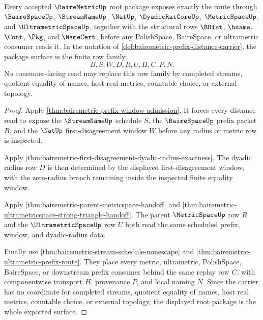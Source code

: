 \begin{theorem}
\label{thm:bairemetric-root-prefix-ultrametric-package}
Every accepted $\BaireMetricUp$ root package exposes exactly the route through $\BaireSpaceUp$, $\StreamNameUp$, $\NatUp$, $\DyadicRatCoreUp$, $\MetricSpaceUp$, and $\UltrametricSpaceUp$, together with the structural rows $\BHist$, $\hsame$, $\Cont$, $\Pkg$, and $\NameCert$, before any PolishSpace, BaireSpace, or ultrametric consumer reads it. In the notation of \autoref{def:bairemetric-prefix-distance-carrier}, the package surface is the finite row family
$$
B,S,W,D,R,U,H,C,P,N .
$$
No consumer-facing read may replace this row family by completed streams, quotient equality of names, host real metrics, countable choice, or external topology.
\end{theorem}
\begin{proof}
Apply \autoref{thm:bairemetric-prefix-window-admission}. It forces every distance read to expose the $\StreamNameUp$ schedule $S$, the $\BaireSpaceUp$ prefix packet $B$, and the $\NatUp$ first-disagreement window $W$ before any radius or metric row is inspected.

Apply \autoref{thm:bairemetric-first-disagreement-dyadic-radius-exactness}. The dyadic radius row $D$ is then determined by the displayed first-disagreement window, with the zero-radius branch remaining inside the inspected finite equality window.

Apply \autoref{thm:bairemetric-parent-metricspace-handoff} and \autoref{thm:bairemetric-ultrametricspace-strong-triangle-handoff}. The parent $\MetricSpaceUp$ row $R$ and the $\UltrametricSpaceUp$ row $U$ both read the same scheduled prefix, window, and dyadic-radius data.

Finally use \autoref{thm:bairemetric-stream-schedule-nonescape} and \autoref{thm:bairemetric-ultrametric-prefix-route}. They place every metric, ultrametric, PolishSpace, BaireSpace, or downstream prefix consumer behind the same replay row $C$, with componentwise transport $H$, provenance $P$, and local naming $N$. Since the carrier has no coordinate for completed streams, quotient equality of names, host real metrics, countable choice, or external topology, the displayed root package is the whole exported surface.
\end{proof}

